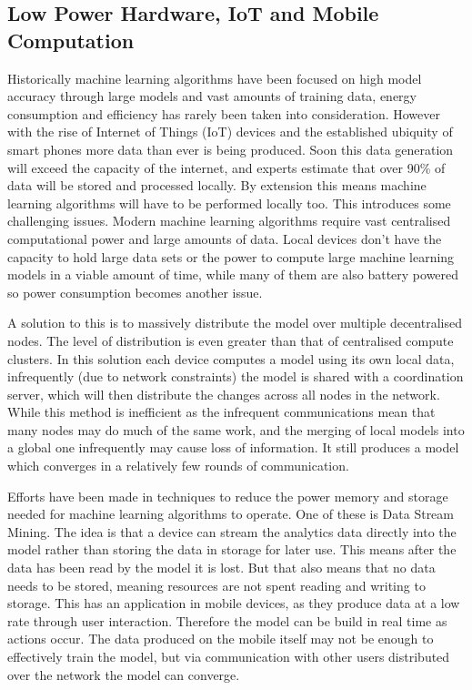 \subsection{Low Power Hardware, IoT and Mobile Computation}

Historically machine learning algorithms have been focused on high model
accuracy through large models and vast amounts of training data, energy
consumption and efficiency has rarely been taken into consideration. However
with the rise of Internet of Things (IoT) devices and the established ubiquity
of smart phones more data than ever is being produced. Soon this data generation
will exceed the capacity of the internet, and experts estimate that over 90\% of
data will be stored and processed locally. \cite{Chaing2016FogIoT} By extension
this means machine learning algorithms will have to be performed locally too.
This introduces some challenging issues. Modern machine learning algorithms
require vast centralised computational power and large amounts of data. Local
devices don't have the capacity to hold large data sets or the power to compute
large machine learning models in a viable amount of time, while many of them are
also battery powered so power consumption becomes another issue.

A solution to this is to massively distribute the model over multiple
decentralised nodes. The level of distribution is even greater than that of
centralised compute clusters. In this solution each device computes a model
using its own local data, infrequently (due to network constraints) the model is
shared with a coordination server, which will then distribute the changes across
all nodes in the network. \cite{wang2018EdgeLearning} While this method is
inefficient as the infrequent communications mean that many nodes may do much of
the same work, and the merging of local models into a global one infrequently
may cause loss of information. It still produces a model which converges in a
relatively few rounds of communication. \cite{konevcny2016federated}

Efforts have been made in techniques to reduce the power memory and storage
needed for machine learning algorithms to operate. One of these is Data Stream
Mining. The idea is that a device can stream the analytics data directly into
the model rather than storing the data in storage for later use.
\cite{garciaMartin2019MLEnergy} This means after the data has been read by the
model it is lost. But that also means that no data needs to be stored, meaning
resources are not spent reading and writing to storage. This has an application
in mobile devices, as they produce data at a low rate through user interaction.
Therefore the model can be build in real time as actions occur. The data
produced on the mobile itself may not be enough to effectively train the model,
but via communication with other users distributed over the network the model
can converge. \cite{konevcny2016federated}

